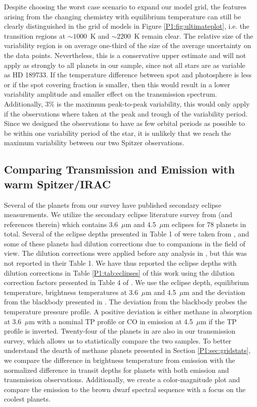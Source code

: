 Despite choosing the worst case scenario to expand our model grid, the features arising from the changing chemistry with equilibrium temperature can still be clearly distinguished in the grid of models in Figure \ref{P1:fig:ultimateplot}, i.e. the transition regions at $\sim1000$~K and $\sim 2200$~K remain clear. The relative size of the variability region is on average one-third of the size of the average uncertainty on the data points. Nevertheless, this is a conservative upper estimate and will not apply as strongly to all planets in our sample, since not all stars are as variable as HD 189733. If the temperature difference between spot and photosphere is less or if the spot covering fraction is smaller, then this would result in a lower variability amplitude and smaller effect on the transmission spectrum. Additionally, 3\% is the maximum peak-to-peak variability, this would only apply if the observations where taken at the peak and trough of the variability period. Since we designed the observations to have as few orbital periods as possible to be within one variability period of the star, it is unlikely that we reach the maximum variability between our two Spitzer observations.

\subsection{Comparing Transmission and Emission with warm Spitzer/IRAC}
\label{P1:sec:TvsE}

Several of the planets from our survey have published secondary eclipse measurements. We utilize the secondary eclipse literature survey from \citet{Baxter2020} (and references therein) which contains 3.6~$\mu$m and 4.5~$\mu$m eclipses for 78 planets in total. Several of the eclipse depths presented in Table 1 of \citet{Baxter2020} were taken from \citet{Garhart2020}, and some of these planets had dilution corrections due to companions in the field of view. The dilution corrections were applied before any analysis in \citet{Baxter2020}, but this was not reported in their Table 1. We have thus reported the eclipse depths with dilution corrections in Table \ref{P1:tab:eclipses} of this work using the dilution correction factors presented in Table 4 of \citet{Garhart2020}. We use the eclipse depth, equilibrium temperature, brightness temperatures at 3.6~$\mu$m and 4.5~$\mu$m and the deviation from the blackbody presented in \citet{Baxter2020}. The deviation from the blackbody probes the temperature pressure profile. A positive deviation is either methane in absorption at 3.6~$\mu$m with a nominal TP profile or CO in emission at 4.5~$\mu$m if the TP profile is inverted. Twenty-four of the planets in \citep{Baxter2020} are also in our transmission survey, which allows us to statistically compare the two samples. To better understand the dearth of methane planets presented in Section \ref{P1:sec:gridstats}, we compare the difference in brightness temperature from emission with the normalized difference in transit depths for planets with both emission and transmission observations. Additionally, we create a color-magnitude plot and compare the emission to the brown dwarf spectral sequence with a focus on the coolest planets.

